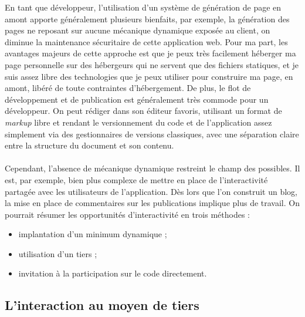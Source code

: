 \documentclass[a4paper,10pt]{article}
\begin{document}
En tant que développeur, l'utilisation d'un système de génération de page en
amont apporte généralement plusieurs bienfaits, par exemple, la génération
des pages ne reposant sur aucune mécanique dynamique exposée au client,
on diminue la maintenance sécuritaire de cette application web.
Pour ma part, les avantages majeurs de cette approche est que je peux très
facilement héberger ma page personnelle sur des hébergeurs qui ne servent
que des fichiers statiques, et je suis assez libre des technologies que je
peux utiliser pour construire ma page, en amont, libéré de toute contraintes
d'hébergement. De plus, le flot de développement et de publication est
généralement très commode pour un développeur. On peut rédiger dans son
éditeur favoris, utilisant un format de \textit{markup} libre et rendant le
versionnement du code et de l'application assez simplement via des
gestionnaires de versions classiques, avec une séparation claire entre la
structure du document et son contenu.
\\~\\
Cependant, l'absence de mécanique dynamique restreint le champ des possibles.
Il est, par exemple, bien plus complexe de mettre en place de l'interactivité
partagée avec les utilisateurs de l'application. Dès lors que l'on construit
un blog, la mise en place de commentaires sur les publications implique
plus de travail. On pourrait résumer les opportunités d'interactivité en
trois méthodes : \\
\begin{itemize}
\item implantation d'un minimum dynamique ;
\item utilisation d'un tiers ;
\item invitation à la participation sur le code directement.
\end{itemize}

\subsection*{L'interaction au moyen de tiers}

\newpage


\end{document}
